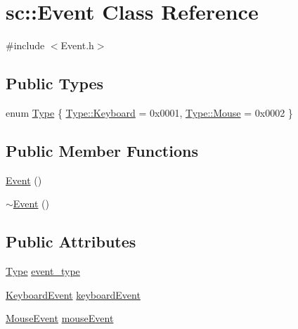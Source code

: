 \hypertarget{classsc_1_1_event}{}\section{sc\+::Event Class Reference}
\label{classsc_1_1_event}


{\ttfamily \#include $<$Event.\+h$>$}

\subsection*{Public Types}
\begin{DoxyCompactItemize}
\item 
enum \mbox{\hyperlink{classsc_1_1_event_a2aeb7e82d52a083b626e7baf3f81cc8a}{Type}} \{ \mbox{\hyperlink{classsc_1_1_event_a2aeb7e82d52a083b626e7baf3f81cc8aa6ce4d85a628a88bbdb3ac24a8e5a9c2e}{Type\+::\+Keyboard}} = 0x0001, 
\mbox{\hyperlink{classsc_1_1_event_a2aeb7e82d52a083b626e7baf3f81cc8aaf2a47c6809d88e175dade0ef7b16aa13}{Type\+::\+Mouse}} = 0x0002
 \}
\end{DoxyCompactItemize}
\subsection*{Public Member Functions}
\begin{DoxyCompactItemize}
\item 
\mbox{\hyperlink{classsc_1_1_event_a5a40dd4708297f7031e29b39e039ae10}{Event}} ()
\item 
\mbox{\hyperlink{classsc_1_1_event_a7704ec01ce91e673885792054214b3d2}{$\sim$\+Event}} ()
\end{DoxyCompactItemize}
\subsection*{Public Attributes}
\begin{DoxyCompactItemize}
\item 
\mbox{\hyperlink{classsc_1_1_event_a2aeb7e82d52a083b626e7baf3f81cc8a}{Type}} \mbox{\hyperlink{classsc_1_1_event_ade0fcce9d293157a80f712eb912ece21}{event\+\_\+type}}
\item 
\mbox{\hyperlink{classsc_1_1_keyboard_event}{Keyboard\+Event}} \mbox{\hyperlink{classsc_1_1_event_a8f5b5d2cc9e63a71009ca58613e9929a}{keyboard\+Event}}
\item 
\mbox{\hyperlink{classsc_1_1_mouse_event}{Mouse\+Event}} \mbox{\hyperlink{classsc_1_1_event_ae7f6b1807c791e255f66007a5ae1eb2b}{mouse\+Event}}
\end{DoxyCompactItemize}


